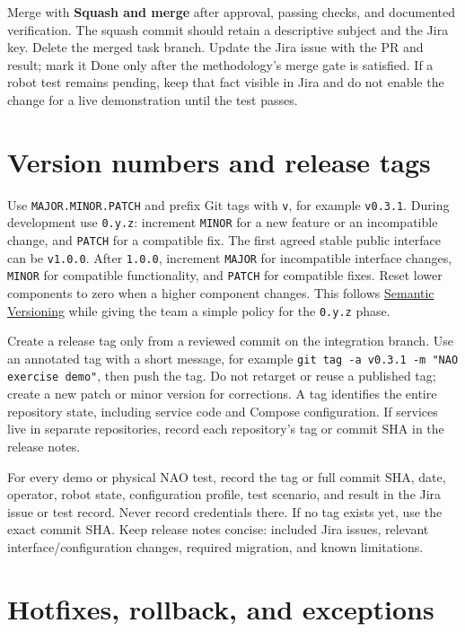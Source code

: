 \documentclass[12pt,a4paper]{article}
\begin{document}
Merge with \textbf{Squash and merge} after approval, passing checks, and documented verification. The squash commit should retain a descriptive subject and the Jira key. Delete the merged task branch. Update the Jira issue with the PR and result; mark it Done only after the methodology's merge gate is satisfied. If a robot test remains pending, keep that fact visible in Jira and do not enable the change for a live demonstration until the test passes.

\section{Version numbers and release tags}

Use \texttt{MAJOR.MINOR.PATCH} and prefix Git tags with \texttt{v}, for example \texttt{v0.3.1}. During development use \texttt{0.y.z}: increment \texttt{MINOR} for a new feature or an incompatible change, and \texttt{PATCH} for a compatible fix. The first agreed stable public interface can be \texttt{v1.0.0}. After \texttt{1.0.0}, increment \texttt{MAJOR} for incompatible interface changes, \texttt{MINOR} for compatible functionality, and \texttt{PATCH} for compatible fixes. Reset lower components to zero when a higher component changes. This follows \href{https://semver.org/}{Semantic Versioning} while giving the team a simple policy for the \texttt{0.y.z} phase.

Create a release tag only from a reviewed commit on the integration branch. Use an annotated tag with a short message, for example \texttt{git tag -a v0.3.1 -m "NAO exercise demo"}, then push the tag. Do not retarget or reuse a published tag; create a new patch or minor version for corrections. A tag identifies the entire repository state, including service code and Compose configuration. If services live in separate repositories, record each repository's tag or commit SHA in the release notes.

For every demo or physical NAO test, record the tag or full commit SHA, date, operator, robot state, configuration profile, test scenario, and result in the Jira issue or test record. Never record credentials there. If no tag exists yet, use the exact commit SHA. Keep release notes concise: included Jira issues, relevant interface/configuration changes, required migration, and known limitations.

\section{Hotfixes, rollback, and exceptions}
\end{document}
